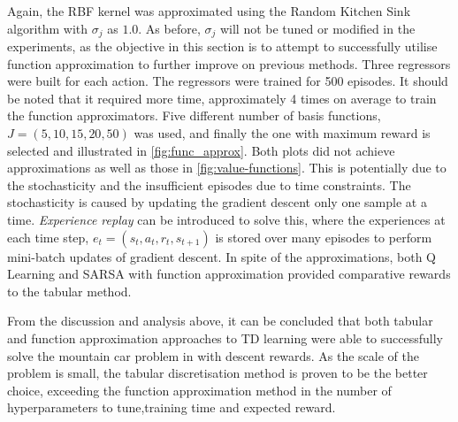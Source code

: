 \documentclass{article}
\begin{document}
Again, the RBF kernel was approximated using the Random Kitchen Sink algorithm with $\sigma_j$ as $1.0$. As before, $\sigma_j$ will not be tuned or modified in the experiments, as the objective in this section is to attempt to successfully utilise function approximation to further improve on previous methods. Three regressors were built for each action. The regressors were trained for 500 episodes. It should be noted that it required more time, approximately 4 times on average to train the function approximators. Five different number of basis functions, $J = (5, 10, 15, 20, 50)$ was used, and finally the one with maximum reward is selected and illustrated in \cref{fig:func_approx}. Both plots did not achieve approximations as well as those in \cref{fig:value-functions}. This is potentially due to the stochasticity and the insufficient episodes due to time constraints. The stochasticity is caused by updating the gradient descent only one sample at a time. \emph{Experience replay} can be introduced to solve this, where the experiences at each time step, $e_t = (s_t, a_t, r_t, s_{t+1})$ is stored over many episodes to perform mini-batch updates of gradient descent. In spite of the approximations, both Q Learning and SARSA with function approximation provided comparative rewards to the tabular method.


From the discussion and analysis above, it can be concluded that both tabular and function approximation approaches to TD learning were able to successfully solve the mountain car problem in with descent rewards. As the scale of the problem is small, the tabular discretisation method is proven to be the better choice, exceeding the function approximation method in the number of hyperparameters to tune,training time and expected reward.
\end{document}

